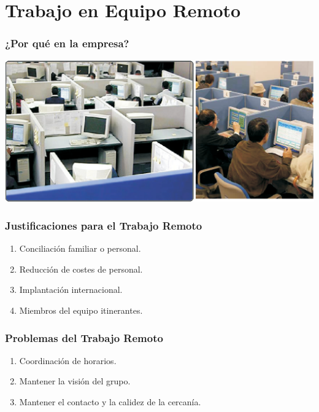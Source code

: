 \documentclass[handout,a4paper,slidestop,xcolor=pst,dvips,blue]{beamer}
\begin{document}
\section{Trabajo en Equipo Remoto}

\begin{frame}[c]
	\frametitle{¿Por qué en la empresa?}
	\begin{center}
\includegraphics[width=\linewidth,keepaspectratio=true]{images/realidad.eps}
	\end{center}
\end{frame}

\begin{frame}[c]
	\frametitle{Justificaciones para el Trabajo Remoto}
	\begin{enumerate}[<+->]
        \item Conciliación familiar o personal.
        \item Reducción de costes de personal.
        \item Implantación internacional.
        \item Miembros del equipo itinerantes. 
	\end{enumerate}
\end{frame}

\begin{frame}[c]
	\frametitle{Problemas del Trabajo Remoto}
	\begin{enumerate}[<+->]
        \item Coordinación de horarios.
        \item Mantener la visión del grupo.
        \item Mantener el contacto y la calidez de la cercanía.
	\end{enumerate}
\end{frame}
\end{document}
